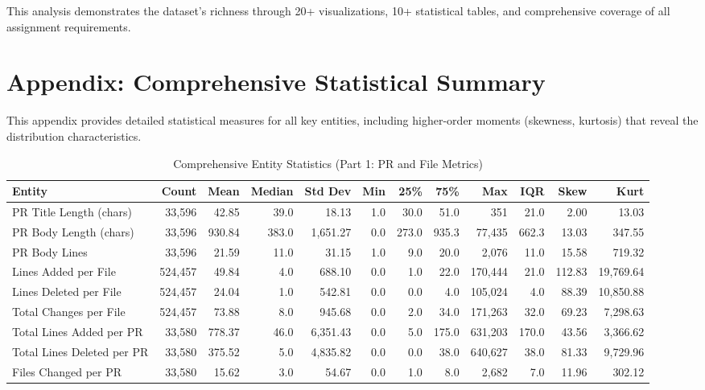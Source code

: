 \documentclass[11pt]{article}
\begin{document}
This analysis demonstrates the dataset's richness through 20+ visualizations, 10+ statistical tables, and comprehensive coverage of all assignment requirements.

\section*{Appendix: Comprehensive Statistical Summary}

This appendix provides detailed statistical measures for all key entities, including higher-order moments (skewness, kurtosis) that reveal the distribution characteristics.

\begin{table}[H]
\centering
\caption{Comprehensive Entity Statistics (Part 1: PR and File Metrics)}
\tiny
\begin{tabular}{@{}lrrrrrrrrrrr@{}}
\toprule
\textbf{Entity} & \textbf{Count} & \textbf{Mean} & \textbf{Median} & \textbf{Std Dev} & \textbf{Min} & \textbf{25\%} & \textbf{75\%} & \textbf{Max} & \textbf{IQR} & \textbf{Skew} & \textbf{Kurt} \\
\midrule
PR Title Length (chars) & 33,596 & 42.85 & 39.0 & 18.13 & 1.0 & 30.0 & 51.0 & 351 & 21.0 & 2.00 & 13.03 \\
PR Body Length (chars) & 33,596 & 930.84 & 383.0 & 1,651.27 & 0.0 & 273.0 & 935.3 & 77,435 & 662.3 & 13.03 & 347.55 \\
PR Body Lines & 33,596 & 21.59 & 11.0 & 31.15 & 1.0 & 9.0 & 20.0 & 2,076 & 11.0 & 15.58 & 719.32 \\
Lines Added per File & 524,457 & 49.84 & 4.0 & 688.10 & 0.0 & 1.0 & 22.0 & 170,444 & 21.0 & 112.83 & 19,769.64 \\
Lines Deleted per File & 524,457 & 24.04 & 1.0 & 542.81 & 0.0 & 0.0 & 4.0 & 105,024 & 4.0 & 88.39 & 10,850.88 \\
Total Changes per File & 524,457 & 73.88 & 8.0 & 945.68 & 0.0 & 2.0 & 34.0 & 171,263 & 32.0 & 69.23 & 7,298.63 \\
Total Lines Added per PR & 33,580 & 778.37 & 46.0 & 6,351.43 & 0.0 & 5.0 & 175.0 & 631,203 & 170.0 & 43.56 & 3,366.62 \\
Total Lines Deleted per PR & 33,580 & 375.52 & 5.0 & 4,835.82 & 0.0 & 0.0 & 38.0 & 640,627 & 38.0 & 81.33 & 9,729.96 \\
Files Changed per PR & 33,580 & 15.62 & 3.0 & 54.67 & 0.0 & 1.0 & 8.0 & 2,682 & 7.0 & 11.96 & 302.12 \\
\bottomrule
\end{tabular}
\end{table}
\end{document}
